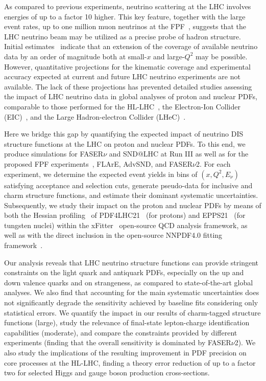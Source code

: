 As compared to  previous experiments,  neutrino
scattering at the LHC involves energies of up to a factor 10  higher.
%
This key feature, together with the large event rates,
up to one million muon neutrinos at the FPF~\cite{Kling:2021gos},
suggests that the LHC  neutrino beam may be utilized
as a precise probe of hadron structure.
%
Initial estimates~\cite{Feng:2022inv} indicate that an extension of the coverage of
available neutrino data by an order of magnitude both at small-$x$
and large-$Q^2$ may be possible.
%
However, quantitative projections for the kinematic coverage
and experimental accuracy expected at current
and future LHC neutrino experiments are not available.
%
The lack of these projections has prevented detailed studies assessing the impact
of LHC neutrino data in global analyses of proton and nuclear PDFs, comparable to
those performed for the HL-LHC~\cite{AbdulKhalek:2018rok,Azzi:2019yne}, the Electron-Ion Collider (EIC)~\cite{AbdulKhalek:2021gbh,Khalek:2021ulf,AbdulKhalek:2019mzd}, and the
Large Hadron-electron Collider (LHeC)~\cite{AbdulKhalek:2019mps,LHeC:2020van,LHeCStudyGroup:2012zhm}. 

Here we bridge this gap by quantifying
the expected impact of  neutrino DIS structure functions at the LHC on proton and nuclear PDFs.
%
To this end, we produce simulations for  FASER$\nu$ and SND@LHC at Run III 
as well as for the proposed FPF experiments~\cite{Anchordoqui:2021ghd,Feng:2022inv,Batell:2021blf,Batell:2021aja}, FLArE, AdvSND, and FASER$\nu$2.
%
For each experiment, we determine the expected event yields in bins of $(x,Q^2,E_\nu)$
satisfying acceptance and selection cuts,
generate pseudo-data for  inclusive and charm 
structure functions, 
and estimate their dominant systematic uncertainties.
%
Subsequently, we study their impact on the proton and nuclear PDFs by means of both the Hessian profiling~\cite{Paukkunen:2014zia,  Schmidt:2018hvu, AbdulKhalek:2018rok, HERAFitterdevelopersTeam:2015cre}
of  PDF4LHC21~\cite{PDF4LHCWorkingGroup:2022cjn} (for protons) and EPPS21~\cite{Eskola:2021nhw}
(for tungsten nuclei)
within the {\sc\small xFitter}~\cite{Alekhin:2014irh, Bertone:2017tig, xFitter:2022zjb, xFitter:web} open-source QCD analysis framework,
as well as with the direct inclusion in the open-source NNPDF4.0 fitting framework~\cite{NNPDF:2021uiq}.

Our analysis reveals that  LHC neutrino structure functions can provide  stringent constraints
on the light quark and antiquark PDFs, especially on the up and down
valence quarks and on strangeness, as compared to state-of-the-art global analyses.
%
We also  find that accounting for the main systematic uncertainties does not significantly
degrade the sensitivity achieved by baseline fits considering only statistical errors.
%
We quantify the impact in our results of charm-tagged structure functions (large), study the relevance
of final-state lepton-charge identification capabilities (moderate), and compare the constraints
provided by different experiments (finding that the overall sensitivity is dominated by FASER$\nu$2).
%
We also study the implications of the resulting improvement in PDF precision
on core processes at the HL-LHC, finding a theory error reduction
of up to a factor two for selected  Higgs and gauge boson production
cross-sections. 

